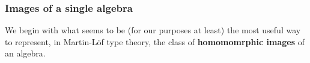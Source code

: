 \subsubsection{Images of a single algebra}\label{images-of-a-single-algebra}
We begin with what seems to be (for our purposes at least) the most useful way to represent, in Martin-Löf type theory, the class of \textbf{homomomrphic images} of an algebra.
\ccpad
\begin{code}%
\>[0]\AgdaSpace{}%
\AgdaSymbol{:}\AgdaSpace{}%
\AgdaSymbol{\{}\AgdaSpace{}%
\AgdaSpace{}%
\AgdaSymbol{:}\AgdaSpace{}%
\AgdaSymbol{\}\{}\AgdaSpace{}%
\AgdaSymbol{:}\AgdaSpace{}%
\AgdaSpace{}%
\AgdaSpace{}%
\AgdaSymbol{\}(}\AgdaSpace{}%
\AgdaSymbol{:}\AgdaSpace{}%
\AgdaSpace{}%
\AgdaSpace{}%
\AgdaSymbol{)(}\AgdaSpace{}%
\AgdaSymbol{:}\AgdaSpace{}%
\AgdaSpace{}%
\AgdaSpace{}%
\AgdaSymbol{)}\AgdaSpace{}%
\AgdaSpace{}%
\AgdaSpace{}%
\AgdaSpace{}%
\AgdaSpace{}%
\AgdaSpace{}%
\AgdaSpace{}%
\AgdaSpace{}%
\AgdaSpace{}%
\<%
\\
\>[0]\AgdaSpace{}%
\AgdaSpace{}%
\AgdaSpace{}%
\AgdaSymbol{=}\AgdaSpace{}%
\AgdaSpace{}%
\AgdaSpace{}%
\AgdaSpace{}%
\AgdaSpace{}%
\AgdaSpace{}%
\AgdaSpace{}%
\AgdaSpace{}%
\AgdaSpace{}%
\<%
\\
%
\\[\AgdaEmptyExtraSkip]%
\>[0]\AgdaSpace{}%
\AgdaSymbol{:}\AgdaSpace{}%
\AgdaSymbol{\{}\AgdaSpace{}%
\AgdaSpace{}%
\AgdaSymbol{:}\AgdaSpace{}%
\AgdaSymbol{\}}\AgdaSpace{}%
\AgdaSpace{}%
\AgdaSpace{}%
\AgdaSpace{}%
\AgdaSpace{}%
\AgdaSpace{}%
\AgdaSpace{}%
\AgdaSpace{}%
\AgdaSpace{}%
\AgdaSpace{}%
\AgdaSpace{}%
\AgdaSpace{}%

\end{code}
